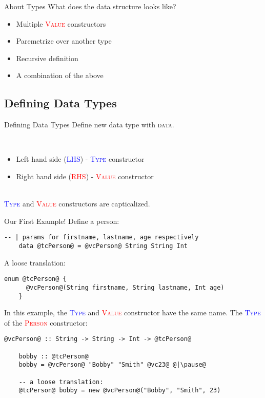 \documentclass[xcolor={usenames,dvipsnames}]{beamer}
\newcommand{\hkeyword}[1]{\textcolor{TealBlue}{\textsc{#1}}}
\newcommand{\htycon}[1]{\textcolor{Blue}{\textsc{#1}}}
\newcommand{\hvalcon}[1]{\textcolor{Red}{\textsc{#1}}}
\begin{document}
\begin{frame}[fragile]{About Types}
  What does the data structure looks like?
  \pause
  \begin{itemize}
    \item Multiple \hvalcon{Value} constructors
    \pause
    \item Paremetrize over another type
    \pause
    \item Recursive definition
    \pause
    \item A combination of the above
  \end{itemize}
\end{frame}

\subsection{Defining Data Types}
\begin{frame}[fragile]{Defining Data Types}
  Define new data type with \hkeyword{data}.

  \pause
  \ \\
  \begin{itemize}
    \item Left hand side (\htycon{LHS}) - \htycon{Type} constructor
    \item Right hand side (\hvalcon{RHS}) - \hvalcon{Value} constructor
  \end{itemize}

  \pause
  \ \\
  \htycon{Type} and \hvalcon{Value} constructors are capticalized.
\end{frame}

\begin{frame}[fragile]{Our First Example!}
  Define a person:
  \begin{lstlisting}[style=hask]
    -- | params for firstname, lastname, age respectively
    data @tcPerson@ = @vcPerson@ String String Int
  \end{lstlisting}

  \pause
  A loose translation:
  \begin{lstlisting}[style=hask]
    enum @tcPerson@ {
      @vcPerson@(String firstname, String lastname, Int age)
    }
  \end{lstlisting}

  \pause
  In this example, the \htycon{Type} and \hvalcon{Value} constructor have the same name. The \htycon{Type} of the \hvalcon{Person} constructor:
  \begin{lstlisting}[style=hask]
    @vcPerson@ :: String -> String -> Int -> @tcPerson@

    bobby :: @tcPerson@
    bobby = @vcPerson@ "Bobby" "Smith" @vc23@ @|\pause@

    -- a loose translation:
    @tcPerson@ bobby = new @vcPerson@("Bobby", "Smith", 23)
  \end{lstlisting}
\end{frame}
\end{document}
